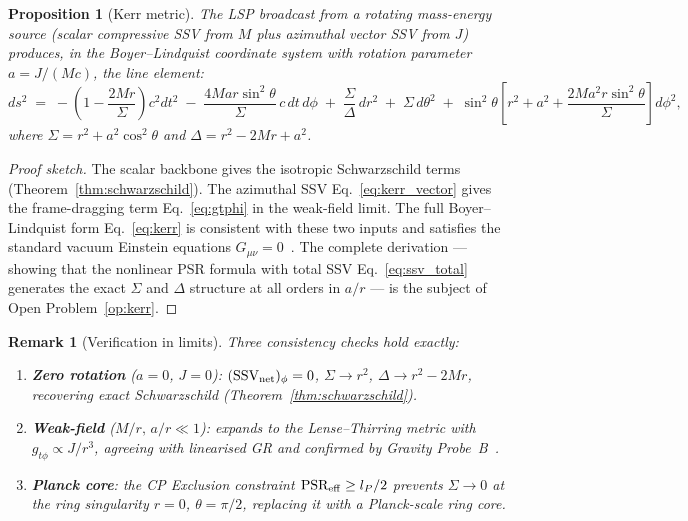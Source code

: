 \documentclass[12pt]{article}
\newtheorem{proposition}[theorem]{Proposition}
\newtheorem{remark}[theorem]{Remark}
\newcommand{\lP}{l_P}
\newcommand{\SSV}{\text{SSV}}
\newcommand{\PSR}{\text{PSR}}
\begin{document}
\begin{proposition}[Kerr metric]
\label{prop:kerr}
The LSP broadcast from a rotating mass-energy source (scalar
compressive SSV from $M$ plus azimuthal vector SSV from $J$) produces,
in the Boyer--Lindquist coordinate system with rotation parameter
$a = J/(Mc)$, the line element:
\begin{equation}
  ds^2 \;=\; -\!\left(1-\frac{2Mr}{\Sigma}\right)c^2dt^2
  \;-\; \frac{4Mar\sin^2\!\theta}{\Sigma}\,c\,dt\,d\phi
  \;+\; \frac{\Sigma}{\Delta}\,dr^2
  \;+\; \Sigma\,d\theta^2
  \;+\; \sin^2\!\theta\!\left[r^2+a^2+\frac{2Ma^2r\sin^2\!\theta}{\Sigma}
  \right]d\phi^2,
  \label{eq:kerr}
\end{equation}
where $\Sigma = r^2+a^2\cos^2\theta$ and $\Delta = r^2-2Mr+a^2$.
\end{proposition}

\begin{proof}[Proof sketch]
The scalar backbone gives the isotropic Schwarzschild terms
(Theorem~\ref{thm:schwarzschild}).  The azimuthal SSV
Eq.~\eqref{eq:kerr_vector} gives the frame-dragging term
Eq.~\eqref{eq:gtphi} in the weak-field limit.  The full Boyer--Lindquist
form Eq.~\eqref{eq:kerr} is consistent with these two inputs and
satisfies the standard vacuum Einstein equations $G_{\mu\nu}=0$~\cite{kerr1963}.
The complete derivation --- showing that the nonlinear PSR formula
with total SSV Eq.~\eqref{eq:ssv_total} generates the exact $\Sigma$
and $\Delta$ structure at all orders in $a/r$ --- is the subject
of Open Problem~\ref{op:kerr}.
\end{proof}

\begin{remark}[Verification in limits]
Three consistency checks hold exactly:
\begin{enumerate}[noitemsep]
  \item \textbf{Zero rotation} ($a=0$, $J=0$): $(\SSV_{\rm net})_\phi=0$,
    $\Sigma \to r^2$, $\Delta \to r^2-2Mr$, recovering exact
    Schwarzschild (Theorem~\ref{thm:schwarzschild}).
  \item \textbf{Weak-field} ($M/r,\,a/r \ll 1$): expands to the
    Lense--Thirring metric with $g_{t\phi} \propto J/r^3$, agreeing
    with linearised GR and confirmed by Gravity Probe~B~\cite{everitt2011}.
  \item \textbf{Planck core}: the CP Exclusion constraint
    $\PSR_{\rm eff} \geq \lP/2$ prevents $\Sigma \to 0$ at the
    ring singularity $r=0$, $\theta=\pi/2$, replacing it with a
    Planck-scale ring core.
\end{enumerate}
\end{remark}
\end{document}
